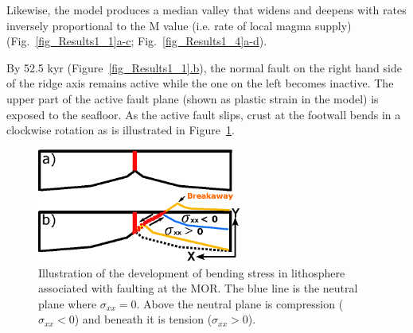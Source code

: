 Likewise, the model produces a median valley that widens and deepens with rates inversely proportional to the M value (i.e. rate of local magma supply) (Fig.~\hyperref[fig_Results1_1]{\ref{fig_Results1_1}a-c}; Fig.~\hyperref[fig_Results1_4]{\ref{fig_Results1_4}a-d}).  %


By 52.5 kyr (Figure~\hyperref[fig_Results1_1]{\ref{fig_Results1_1}.b}), the normal fault on the right hand side of the ridge axis remains active while the one on the left becomes inactive. The upper part of the active fault plane (shown as plastic strain in the model) is exposed to the seafloor. As the active fault slips, crust at the footwall bends in a clockwise rotation as is illustrated in Figure~\hyperref[fig_Results4_8]{\ref{fig_Results4_8}}. %

\begin{figure}[h]
   \centering
     \includegraphics[width=0.6\textwidth]{./Figures/fig_Results4_8_sqrt_cut_back_bending_cartoon.eps}
   \caption[Illustration of bending stresses in lithosphere associated with faulting at the MOR.]{Illustration of the development of bending stress in lithosphere associated with faulting at the MOR. The blue line is the neutral plane where $\sigma_{xx}=0$. Above the neutral plane is compression ($\sigma_{xx}<0$) and beneath it is tension ($\sigma_{xx}>0$).}
  \label{fig_Results4_8}
\end{figure}

